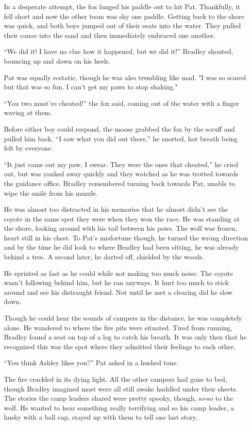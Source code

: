 In a desperate attempt, the fox lunged his paddle out to hit Pat.
Thankfully, it fell short and now the other team was shy one paddle.
Getting back to the shore was quick, and both boys jumped out of their
seats into the water. They pulled their canoe into the sand and then
immediately embraced one another.

``We did it! I have no clue how it happened, but we did it!'' Bradley
shouted, bouncing up and down on his heels.

Pat was equally ecstatic, though he was also trembling like mad. "I was
so scared but that was so fun. I can't get my paws to stop shaking."

``You two must've cheated!'' the fox said, coming out of the water with a
finger waving at them.

Before either boy could respond, the moose grabbed the fox by the scruff
and pulled him back. ``I saw what you did out there,'' he snorted, hot
breath being felt by everyone.

``It just came out my paw, I swear. They were the ones that cheated,'' he
cried out, but was yanked away quickly and they watched as he was
trotted towards the guidance office. Bradley remembered turning back
towards Pat, unable to wipe the smile from his muzzle.

He was almost too distracted in his memories that he almost didn't see
the coyote in the same spot they were when they won the race. He was
standing at the shore, looking around with his tail between his paws.
The wolf was frozen, heart still in his chest. To Pat's misfortune
though, he turned the wrong direction and by the time he did look to
where Bradley had been sitting, he was already behind a tree. A second
later, he darted off, shielded by the woods.

He sprinted as fast as he could while not making too much noise. The
coyote wasn't following behind him, but he ran anyways. It hurt too much
to stick around and see his distraught friend. Not until he met a
clearing did he slow down.

Though he could hear the sounds of campers in the distance, he was
completely alone. He wandered to where the fire pits were situated.
Tired from running, Bradley found a seat on top of a log to catch his
breath. It was only then that he recognized this was the spot where they
admitted their feelings to each other.

``You think Ashley likes you?'' Pat asked in a hushed tone.

The fire crackled in its dying light. All the other campers had gone to
bed, though Bradley imagined most were all still awake huddled under
their sheets. The stories the camp leaders shared were pretty spooky,
though, so-so to the wolf. He wanted to hear something really terrifying
and so his camp leader, a husky with a ball cap, stayed up with them to
tell one last story.

